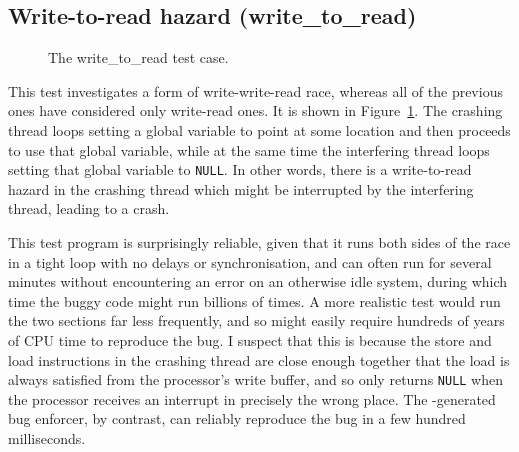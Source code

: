 \subsection{Write-to-read hazard (write\_to\_read)}

\begin{figure}
  \hfill
  \caption{The write\_to\_read test case.}
  \label{fig:eval:write_to_read}
\end{figure}

This test investigates a form of write-write-read race, whereas all of
the previous ones have considered only write-read ones.  It is shown
in Figure~\ref{fig:eval:write_to_read}.  The crashing thread loops
setting a global variable to point at some location and then proceeds
to use that global variable, while at the same time the interfering
thread loops setting that global variable to \texttt{NULL}.  In other
words, there is a write-to-read hazard in the crashing thread which
might be interrupted by the interfering thread, leading to a crash.

This test program is surprisingly reliable, given that it runs both
sides of the race in a tight loop with no delays or synchronisation,
and can often run for several minutes without encountering an error on
an otherwise idle system, during which time the buggy code might run
billions of times.  A more realistic test would run the two sections
far less frequently, and so might easily require hundreds of years of
CPU time to reproduce the bug.  I suspect that this is because the
store and load instructions in the crashing thread are close enough
together that the load is always satisfied from the processor's write
buffer, and so only returns \texttt{NULL} when the processor receives
an interrupt in precisely the wrong place.  The {\technique}-generated
bug enforcer, by contrast, can reliably reproduce the bug in a few
hundred milliseconds.

